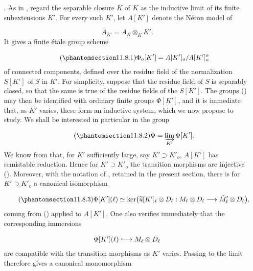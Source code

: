 
. As in , regard the separable closure $\overline K$ of $K$ as the
inductive limit of its finite subextensions $K'$. For every such $K'$, let
$A[K']$ denote the N\'{e}ron model of

\begin{equation*}
A_{K'}=A_K\otimes_K K'.
\end{equation*}
It gives a finite \'{e}tale group scheme

\begin{equation}\tag{\SGARefTarget{sga7.sga7i.eix.n11-8-1}{11.8.1}}
\Phi_o[K']=A[K']_o/A[K']_o^o
\end{equation}
of connected components, defined over the residue field of the normalization
$S[K']$ of $S$ in $K'$. For simplicity, suppose that the residue field of
$S$ is separably closed, so that the same is true of the residue fields of
the $S[K']$. The groups () may then be identified with ordinary finite
groups $\Phi[K']$, and it is immediate that, as $K'$ varies, these form an
inductive system, which we now propose to study. We shall be interested in
particular in the group

\begin{equation}\tag{\SGARefTarget{sga7.sga7i.eix.n11-8-2}{11.8.2}}
\Psi=\varinjlim_{K'}\Phi[K'].
\end{equation}
We know from  that, for $K'$ sufficiently large, say
$K'\supset K'_o$, $A[K']$ has semistable reduction. Hence for
$K'\supset K'_o$ the transition morphisms are injective (). Moreover,
with the notation of , retained in the present section, there is for
$K'\supset K'_o$ a canonical isomorphism

\begin{equation}\tag{\SGARefTarget{sga7.sga7i.eix.n11-8-3}{11.8.3}}
\Phi[K'](\ell)\simeq
\ker\bigl(\widetilde u[K']_\ell\otimes D_\ell:
 M_\ell\otimes D_\ell\longrightarrow
 \check M'_\ell\otimes D_\ell\bigr),
\end{equation}
coming from () applied to $A[K']$. One also verifies immediately that
the corresponding immersions

\begin{equation*}
\Phi[K'](\ell)\lhook\joinrel\longrightarrow M_\ell\otimes D_\ell
\end{equation*}
are compatible with the transition morphisms as $K'$ varies. Passing to the
limit therefore gives a canonical monomorphism

